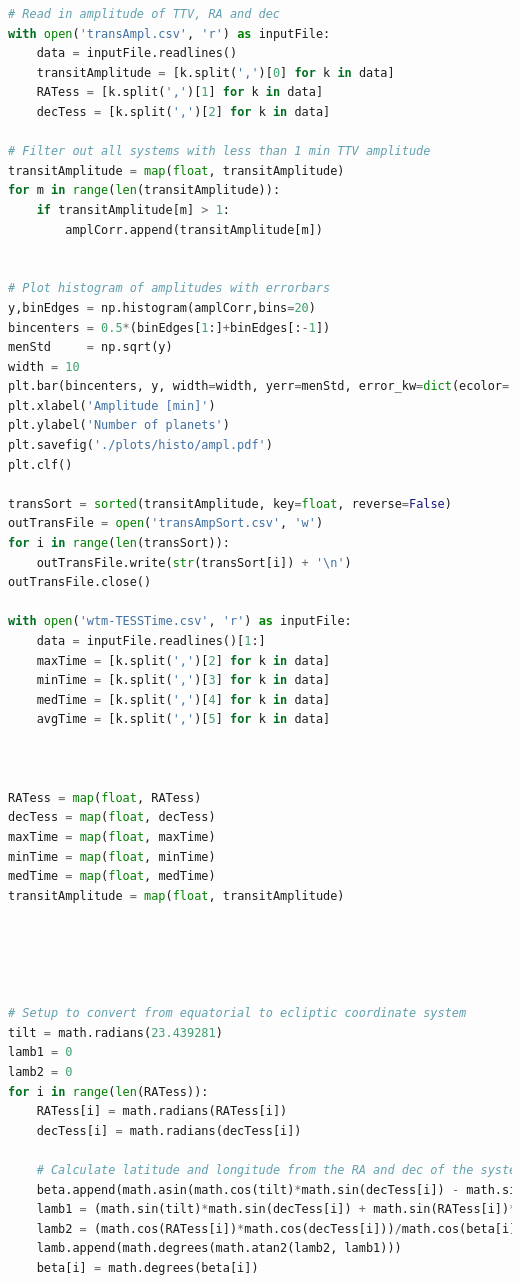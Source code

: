 \documentclass[12pt]{report}
\begin{document}
\begin{appendix}
\begin{lstlisting}[language=Python]
# Read in amplitude of TTV, RA and dec
with open('transAmpl.csv', 'r') as inputFile:
	data = inputFile.readlines()
	transitAmplitude = [k.split(',')[0] for k in data]
	RATess = [k.split(',')[1] for k in data]
	decTess = [k.split(',')[2] for k in data]

# Filter out all systems with less than 1 min TTV amplitude
transitAmplitude = map(float, transitAmplitude)
for m in range(len(transitAmplitude)):
	if transitAmplitude[m] > 1:
		amplCorr.append(transitAmplitude[m])
		
		
# Plot histogram of amplitudes with errorbars
y,binEdges = np.histogram(amplCorr,bins=20)
bincenters = 0.5*(binEdges[1:]+binEdges[:-1])
menStd     = np.sqrt(y)
width = 10
plt.bar(bincenters, y, width=width, yerr=menStd, error_kw=dict(ecolor='black', lw=1, capsize=4, capthick=1))
plt.xlabel('Amplitude [min]')
plt.ylabel('Number of planets')
plt.savefig('./plots/histo/ampl.pdf')
plt.clf()
		
transSort = sorted(transitAmplitude, key=float, reverse=False)
outTransFile = open('transAmpSort.csv', 'w')
for i in range(len(transSort)):
	outTransFile.write(str(transSort[i]) + '\n')
outTransFile.close()

with open('wtm-TESSTime.csv', 'r') as inputFile:
	data = inputFile.readlines()[1:]
	maxTime = [k.split(',')[2] for k in data]
	minTime = [k.split(',')[3] for k in data]
	medTime = [k.split(',')[4] for k in data]
	avgTime = [k.split(',')[5] for k in data]
	

	
RATess = map(float, RATess)
decTess = map(float, decTess)
maxTime = map(float, maxTime)
minTime = map(float, minTime)
medTime = map(float, medTime)
transitAmplitude = map(float, transitAmplitude)





# Setup to convert from equatorial to ecliptic coordinate system
tilt = math.radians(23.439281)
lamb1 = 0
lamb2 = 0
for i in range(len(RATess)):
	RATess[i] = math.radians(RATess[i])
	decTess[i] = math.radians(decTess[i])

	# Calculate latitude and longitude from the RA and dec of the system
	beta.append(math.asin(math.cos(tilt)*math.sin(decTess[i]) - math.sin(RATess[i])*math.cos(decTess[i])*math.sin(tilt)))
	lamb1 = (math.sin(tilt)*math.sin(decTess[i]) + math.sin(RATess[i])*math.cos(decTess[i])*math.cos(tilt))/math.cos(beta[i])
	lamb2 = (math.cos(RATess[i])*math.cos(decTess[i]))/math.cos(beta[i])
	lamb.append(math.degrees(math.atan2(lamb2, lamb1)))
	beta[i] = math.degrees(beta[i])


\end{lstlisting}
\end{appendix}
\end{document}
